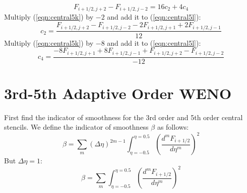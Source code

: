 \documentclass{warpdoc}
\begin{document}
% 
%
\begin{equation}
F_{i+1/2,j+2}-F_{i+1/2,j-2}=  16 c_2  + 4 c_4  
\label{eqn:central5l}
\end{equation}
% 
Multiply (\ref{eqn:central5k}) by $-2$ and add it to (\ref{eqn:central5l}):
%
\begin{equation}
c_2=\frac{F_{i+1/2,j+2}-F_{i+1/2,j-2}-2F_{i+1/2,j+1}+2F_{i+1/2,j-1}}{12}    
\label{eqn:central5_c2}
\end{equation}
% 
Multiply (\ref{eqn:central5k}) by $-8$ and add it to (\ref{eqn:central5l}):
%
\begin{equation}
c_4=\frac{-8F_{i+1/2,j+1}+8F_{i+1/2,j-1}+F_{i+1/2,j+2}-F_{i+1/2,j-2}}{-12}  
\end{equation}
% 



\section{3rd-5th Adaptive Order WENO}

First find the indicator of smoothness for the 3rd order and 5th order central stencils. We define the indicator of smoothness $\beta$  as follows:
%
\begin{equation}
\beta = \sum_m (\Delta \eta)^{2m-1} \int_{\eta=-0.5}^{\eta=0.5} \left( \frac{d^m F_{i+1/2}}{d\eta^m} \right)^2
\end{equation}
%
But $\Delta \eta=1$:
%
\begin{equation}
\beta = \sum_m  \int_{\eta=-0.5}^{\eta=0.5} \left( \frac{d^m F_{i+1/2}}{d\eta^m} \right)^2
\end{equation}
%




\appendix


  
  
\end{document}
